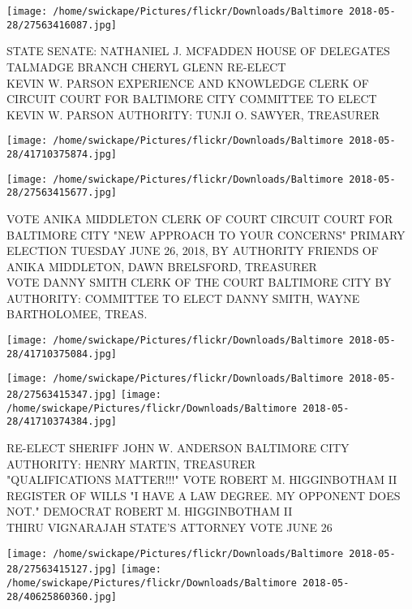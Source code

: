 \documentclass[10pt,letterpaper]{article}
\begin{document}
\vspace{0.25in}
\texttt{[image: /home/swickape/Pictures/flickr/Downloads/Baltimore 2018-05-28/27563416087.jpg]}

STATE SENATE: NATHANIEL J. MCFADDEN HOUSE OF DELEGATES TALMADGE BRANCH CHERYL GLENN RE{-}ELECT\\
KEVIN W. PARSON EXPERIENCE AND KNOWLEDGE CLERK OF CIRCUIT COURT FOR BALTIMORE CITY COMMITTEE TO ELECT KEVIN W. PARSON AUTHORITY: TUNJI O. SAWYER, TREASURER\\
\pagebreak

\texttt{[image: /home/swickape/Pictures/flickr/Downloads/Baltimore 2018-05-28/41710375874.jpg]}

\vspace{0.25in}
\texttt{[image: /home/swickape/Pictures/flickr/Downloads/Baltimore 2018-05-28/27563415677.jpg]}

VOTE ANIKA MIDDLETON CLERK OF COURT CIRCUIT COURT FOR BALTIMORE CITY "NEW APPROACH TO YOUR CONCERNS" PRIMARY ELECTION TUESDAY JUNE 26, 2018, BY AUTHORITY FRIENDS OF ANIKA MIDDLETON, DAWN BRELSFORD, TREASURER\\
VOTE DANNY SMITH CLERK OF THE COURT BALTIMORE CITY BY AUTHORITY: COMMITTEE TO ELECT DANNY SMITH, WAYNE BARTHOLOMEE, TREAS.\\
\pagebreak

\texttt{[image: /home/swickape/Pictures/flickr/Downloads/Baltimore 2018-05-28/41710375084.jpg]}

\vspace{0.25in}
\texttt{[image: /home/swickape/Pictures/flickr/Downloads/Baltimore 2018-05-28/27563415347.jpg]}
\texttt{[image: /home/swickape/Pictures/flickr/Downloads/Baltimore 2018-05-28/41710374384.jpg]}

RE{-}ELECT SHERIFF JOHN W. ANDERSON BALTIMORE CITY AUTHORITY: HENRY MARTIN, TREASURER\\
"QUALIFICATIONS MATTER!!!" VOTE ROBERT M. HIGGINBOTHAM II REGISTER OF WILLS "I HAVE A LAW DEGREE.  MY OPPONENT DOES NOT."  DEMOCRAT ROBERT M. HIGGINBOTHAM II\\
THIRU VIGNARAJAH STATE'S ATTORNEY VOTE JUNE 26\\
\pagebreak

\texttt{[image: /home/swickape/Pictures/flickr/Downloads/Baltimore 2018-05-28/27563415127.jpg]}
\texttt{[image: /home/swickape/Pictures/flickr/Downloads/Baltimore 2018-05-28/40625860360.jpg]}
\end{document}
